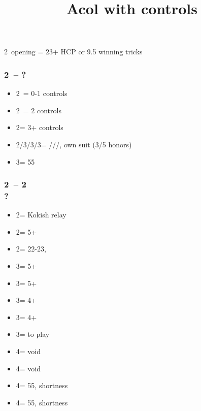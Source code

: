 \documentclass[12pt, a4paper]{article}
\title{Acol with controls}
\author{}
\begin{document}
\maketitle


2\clubs\ opening = 23+ HCP or 9.5 winning tricks

\subsubsection*{2\clubs\ -- ?}
\begin{itemize}
    \item 2\diams\ = 0-1 controls
    \item 2\hearts\ = 2 controls
    \item 2\spades = 3+ controls
    \item 2\nt/3\clubs/3\diams/3\hearts = \clubs/\diams/\hearts/\spades, own suit (3/5 honors)
    \item 3\nt = 55\major
\end{itemize}

\subsubsection*{2\clubs\ -- 2\diams\\?}
\begin{itemize}
    \item 2\hearts = Kokish relay
    \item 2\spades = 5+\spades
    \item 2\nt = 22-23, \bal
    \item 3\clubs = 5+\clubs
    \item 3\diams = 5+\diams
    \item 3\hearts = 4+\diams
    \item 3\spades = 4+\diams
    \item 3\nt = to play
    \item 4\clubs = \hearts void
    \item 4\diams = \spades void
    \item 4\hearts = 55\minor, \hearts shortness
    \item 4\spades = 55\minor, \spades shortness
\end{itemize}
\end{document}
